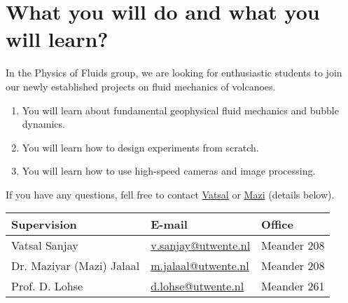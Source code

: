 \documentclass[a4paper,10pt]{article}
\begin{document}
\section*{What you will do and what you will learn?}
In the Physics of Fluids group, we are looking for enthusiastic students to join our newly established projects on fluid mechanics of volcanoes.
\begin{enumerate}
\itemsep0em
\item You will learn about fundamental geophysical fluid mechanics and bubble dynamics.
\item You will learn how to design experiments from scratch.
\item You will learn how to use high-speed cameras and image processing.
\end{enumerate}
If you have any questions, fell free to contact \href{mailto:v.sanjay@utwente.nl}{Vatsal} or \href{mailto:m.jalaal@utwente.nl}{Mazi} (details below).
\begin{center}
\begin{tabular}{|l|l|l|}
\hline \textbf{Supervision} & \textbf{E-mail} & \textbf{Office} \\
\hline Vatsal Sanjay & \href{mailto:v.sanjay@utwente.nl}{v.sanjay@utwente.nl} & Meander 208 \\
\hline Dr. Maziyar (Mazi) Jalaal   & \href{mailto:m.jalaal@utwente.nl}{m.jalaal@utwente.nl}& Meander 208 \\
\hline Prof. D. Lohse & \href{mailto:d.lohse@utwente.nl}{d.lohse@utwente.nl} & Meander 261  \\
\hline
\end{tabular}
\end{center}
\printbibliography
\end{document}
